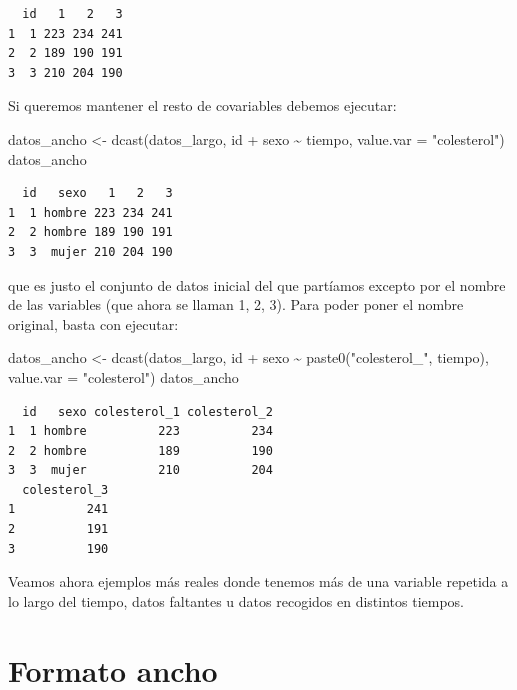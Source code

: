 \documentclass[
]{book}
\newenvironment{Shaded}{\begin{snugshade}}{\end{snugshade}}
\newcommand{\AttributeTok}[1]{\textcolor[rgb]{0.77,0.63,0.00}{#1}}
\newcommand{\FunctionTok}[1]{\textcolor[rgb]{0.00,0.00,0.00}{#1}}
\newcommand{\NormalTok}[1]{#1}
\newcommand{\OtherTok}[1]{\textcolor[rgb]{0.56,0.35,0.01}{#1}}
\newcommand{\SpecialCharTok}[1]{\textcolor[rgb]{0.00,0.00,0.00}{#1}}
\newcommand{\StringTok}[1]{\textcolor[rgb]{0.31,0.60,0.02}{#1}}
\begin{document}
\begin{verbatim}
  id   1   2   3
1  1 223 234 241
2  2 189 190 191
3  3 210 204 190
\end{verbatim}

Si queremos mantener el resto de covariables debemos ejecutar:

\begin{Shaded}
\begin{Highlighting}[]
\NormalTok{datos\_ancho }\OtherTok{\textless{}{-}} \FunctionTok{dcast}\NormalTok{(datos\_largo, id }\SpecialCharTok{+}\NormalTok{ sexo }\SpecialCharTok{\textasciitilde{}}\NormalTok{ tiempo, }
                     \AttributeTok{value.var =} \StringTok{"colesterol"}\NormalTok{)}
\NormalTok{datos\_ancho}
\end{Highlighting}
\end{Shaded}

\begin{verbatim}
  id   sexo   1   2   3
1  1 hombre 223 234 241
2  2 hombre 189 190 191
3  3  mujer 210 204 190
\end{verbatim}

que es justo el conjunto de datos inicial del que partíamos excepto por el nombre de las variables (que ahora se llaman 1, 2, 3). Para poder poner el nombre original, basta con ejecutar:

\begin{Shaded}
\begin{Highlighting}[]
\NormalTok{datos\_ancho }\OtherTok{\textless{}{-}} \FunctionTok{dcast}\NormalTok{(datos\_largo, id }\SpecialCharTok{+}\NormalTok{ sexo }\SpecialCharTok{\textasciitilde{}} \FunctionTok{paste0}\NormalTok{(}\StringTok{"colesterol\_"}\NormalTok{, tiempo), }
                     \AttributeTok{value.var =} \StringTok{"colesterol"}\NormalTok{)}
\NormalTok{datos\_ancho}
\end{Highlighting}
\end{Shaded}

\begin{verbatim}
  id   sexo colesterol_1 colesterol_2
1  1 hombre          223          234
2  2 hombre          189          190
3  3  mujer          210          204
  colesterol_3
1          241
2          191
3          190
\end{verbatim}

Veamos ahora ejemplos más reales donde tenemos más de una variable repetida a lo largo del tiempo, datos faltantes u datos recogidos en distintos tiempos.

\hypertarget{formato-ancho}{%
\section{Formato ancho}\label{formato-ancho}}
\end{document}
